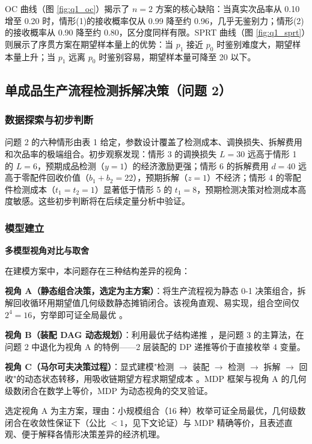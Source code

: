 \documentclass[12pt,a4paper]{ctexart}
\begin{document}
OC 曲线（图 \ref{fig:q1_oc}）揭示了 $n=2$ 方案的核心缺陷：当真实次品率从 0.10 增至 0.20 时，情形(1)的接收概率仅从 0.99 降至约 0.96，几乎无鉴别力；情形(2)的接收概率从 0.90 降至约 0.80，区分度同样有限。SPRT 曲线（图 \ref{fig:q1_sprt}）则展示了序贯方案在期望样本量上的优势：当 $p_1$ 接近 $p_0$ 时鉴别难度大，期望样本量上升；当 $p_1$ 远离 $p_0$ 时鉴别容易，期望样本量可降至 20 以下。

\subsection{单成品生产流程检测拆解决策（问题 2）}

\subsubsection{数据探索与初步判断}

问题 2 的六种情形由表 1 给定，参数设计覆盖了检测成本、调换损失、拆解费用和次品率的极端组合。初步观察发现：情形 3 的调换损失 $L=30$ 远高于情形 1 的 $L=6$，预期成品检测（$y=1$）的经济激励更强；情形 6 的拆解费用 $d=40$ 远高于零配件回收价值（$b_1+b_2=22$），预期拆解（$z=1$）不经济；情形 4 的零配件检测成本（$t_1=t_2=1$）显著低于情形 5 的 $t_1=8$，预期检测决策对检测成本高度敏感。这些初步判断将在后续定量分析中验证。

\subsubsection{模型建立}

\textbf{多模型视角对比与取舍}

在建模方案中，本问题存在三种结构差异的视角：

\textbf{视角 A（静态组合决策，选定为主方案）}：将生产流程视为静态 0-1 决策组合，拆解回收循环用期望值几何级数静态摊销闭合。该视角直观、易实现，组合空间仅 $2^4=16$，穷举即可证全局最优 \cite{ref9}。

\textbf{视角 B（装配 DAG 动态规划）}：利用最优子结构递推 \cite{ref4}，是问题 3 的主算法，在问题 2 中退化为视角 A 的特例——2 层装配的 DP 递推等价于直接枚举 4 变量。

\textbf{视角 C（马尔可夫决策过程）}：显式建模"检测 $\to$ 装配 $\to$ 检测 $\to$ 拆解 $\to$ 回收"的动态状态转移，用吸收链期望方程求期望成本 \cite{ref10}。MDP 框架与视角 A 的几何级数闭合在数学上等价，MDP 为动态视角的交叉验证。

选定视角 A 为主方案，理由：小规模组合（16 种）枚举可证全局最优，几何级数闭合在收敛性保证下（公比 $<1$，见下文论证）与 MDP 精确等价，且表述直观、便于解释各情形决策差异的经济机理。
\end{document}
